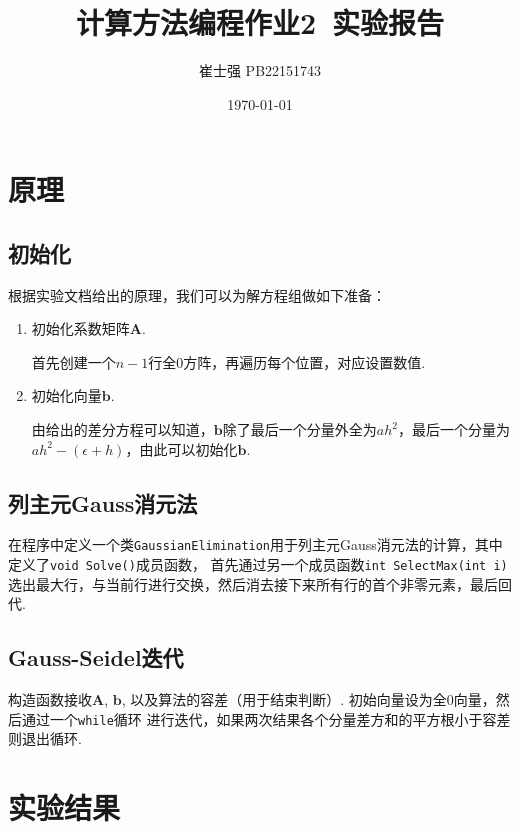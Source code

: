 \documentclass[UTF8]{ctexart}
\title{计算方法编程作业2\ 实验报告}
\author{崔士强 PB22151743}
\date{\today}
\begin{document}
\maketitle
\section{原理}
\subsection{初始化}
根据实验文档给出的原理，我们可以为解方程组做如下准备：
\begin{enumerate}
  \item 初始化系数矩阵$\mathbf{A}$. 
  
  首先创建一个$n-1$行全$0$方阵，再遍历每个位置，对应设置数值.
  \item 初始化向量$\mathbf{b}$. 
  
  由给出的差分方程可以知道，$\mathbf{b}$除了最后一个分量外全为$ah^2$，最后一个分量为$ah^2-(\epsilon + h)$，由此可以初始化$\mathbf{b}$.
\end{enumerate}

\subsection{列主元Gauss消元法}
在程序中定义一个类\lstinline|GaussianElimination|用于列主元Gauss消元法的计算，其中定义了\lstinline|void Solve()|成员函数， 
首先通过另一个成员函数\lstinline|int SelectMax(int i)|选出最大行，与当前行进行交换，然后消去接下来所有行的首个非零元素，最后回代.

\subsection{Gauss-Seidel迭代}
构造函数接收$\mathbf{A}$, $\mathbf{b}$, 以及算法的容差（用于结束判断）. 初始向量设为全$0$向量，然后通过一个\lstinline|while|循环
进行迭代，如果两次结果各个分量差方和的平方根小于容差则退出循环.

\section{实验结果}
\end{document}
